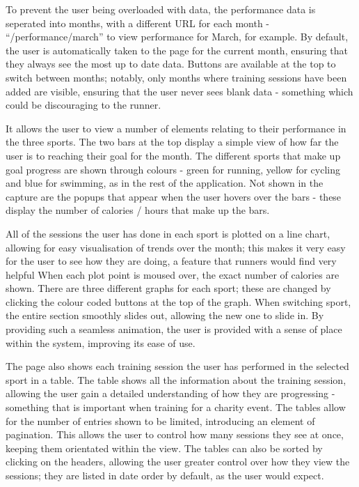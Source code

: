 \documentclass{article}[12pt,a4paper]
\begin{document}
To prevent the user being overloaded with data, the performance data is seperated into months, with a different URL for each month - ``/performance/march'' to view performance for March, for example. By default, the user is automatically taken to the page for the current month, ensuring that they always see the most up to date data. Buttons are available at the top to switch between months; notably, only months where training sessions have been added are visible, ensuring that the user never sees blank data - something which could be discouraging to the runner.

It allows the user to view a number of elements relating to their performance in the three sports. The two bars at the top display a simple view of how far the user is to reaching their goal for the month. The different sports that make up goal progress are shown through colours - green for running, yellow for cycling and blue for swimming, as in the rest of the application. Not shown in the capture are the popups that appear when the user hovers over the bars - these display the number of calories / hours that make up the bars. 

All of the sessions the user has done in each sport is plotted on a line chart, allowing for easy visualisation of trends over the month; this makes it very easy for the user to see how they are doing, a feature that runners would find very helpful When each plot point is moused over, the exact number of calories are shown. There are three different graphs for each sport; these are changed by clicking the colour coded buttons at the top of the graph. When switching sport, the entire section smoothly slides out, allowing the new one to slide in. By providing such a seamless animation, the user is provided with a sense of place within the system, improving its ease of use.

The page also shows each training session the user has performed in the selected sport in a table. The table shows all the information about the training session, allowing the user gain a detailed understanding of how they are progressing - something that is important when training for a charity event. The tables allow for the number of entries shown to be limited, introducing an element of pagination. This allows the user to control how many sessions they see at once, keeping them orientated within the view. The tables can also be sorted by clicking on the headers, allowing the user greater control over how they view the sessions; they are listed in date order by default, as the user would expect.
\end{document}
